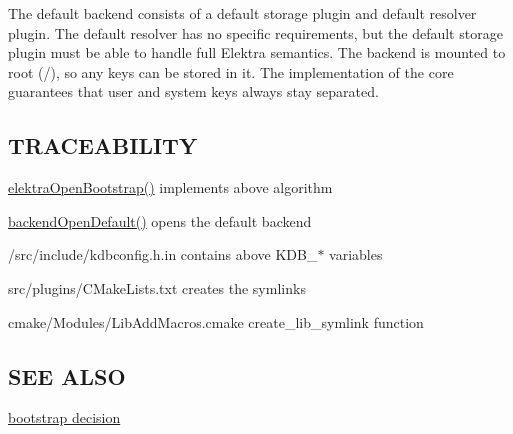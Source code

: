 The default backend consists of a default storage plugin and default resolver plugin. The default resolver has no specific requirements, but the default storage plugin must be able to handle full Elektra semantics. The backend is mounted to root ({\ttfamily /}), so any keys can be stored in it. The implementation of the core guarantees that user and system keys always stay separated.

\subsection*{T\+R\+A\+C\+E\+A\+B\+I\+L\+I\+T\+Y}


\begin{DoxyItemize}
\item \hyperlink{group__kdb_ga5bfaad0230457cd6386032fe65c41576}{elektra\+Open\+Bootstrap()} implements above algorithm
\item \hyperlink{backend_8c_a59e270ed71ca8dca9e88032c307ca4d4}{backend\+Open\+Default()} opens the default backend
\item /src/include/kdbconfig.h.\+in contains above K\+D\+B\+\_\+$\ast$ variables
\item src/plugins/\+C\+Make\+Lists.\+txt creates the symlinks
\item cmake/\+Modules/\+Lib\+Add\+Macros.\+cmake create\+\_\+lib\+\_\+symlink function
\end{DoxyItemize}

\subsection*{S\+E\+E A\+L\+S\+O}


\begin{DoxyItemize}
\item \hyperlink{doc_decisions_bootstrap_md}{bootstrap decision} 
\end{DoxyItemize}